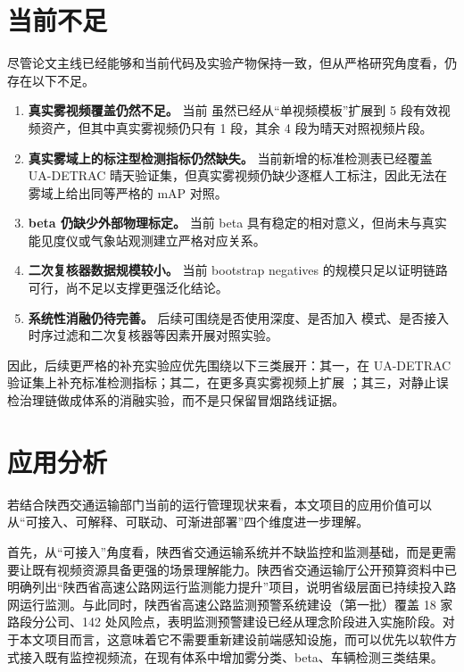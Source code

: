 \section{当前不足}

尽管论文主线已经能够和当前代码及实验产物保持一致，但从严格研究角度看，仍存在以下不足。

\begin{enumerate}[leftmargin=2.5em]
\item \textbf{真实雾视频覆盖仍然不足。} 当前  虽然已经从“单视频模板”扩展到 5 段有效视频资产，但其中真实雾视频仍只有 1 段，其余 4 段为晴天对照视频片段。
\item \textbf{真实雾域上的标注型检测指标仍然缺失。} 当前新增的标准检测表已经覆盖 UA-DETRAC 晴天验证集，但真实雾视频仍缺少逐框人工标注，因此无法在雾域上给出同等严格的 mAP 对照。
\item \textbf{beta 仍缺少外部物理标定。} 当前 beta 具有稳定的相对意义，但尚未与真实能见度仪或气象站观测建立严格对应关系。
\item \textbf{二次复核器数据规模较小。} 当前 bootstrap negatives 的规模只足以证明链路可行，尚不足以支撑更强泛化结论。
\item \textbf{系统性消融仍待完善。} 后续可围绕是否使用深度、是否加入  模式、是否接入时序过滤和二次复核器等因素开展对照实验。
\end{enumerate}

因此，后续更严格的补充实验应优先围绕以下三类展开：其一，在 UA-DETRAC 验证集上补充标准检测指标；其二，在更多真实雾视频上扩展 ；其三，对静止误检治理链做成体系的消融实验，而不是只保留冒烟路线证据。

\section{应用分析}

若结合陕西交通运输部门当前的运行管理现状来看，本文项目的应用价值可以从“可接入、可解释、可联动、可渐进部署”四个维度进一步理解。

首先，从“可接入”角度看，陕西省交通运输系统并不缺监控和监测基础，而是更需要让既有视频资源具备更强的场景理解能力。陕西省交通运输厅公开预算资料中已明确列出“陕西省高速公路网运行监测能力提升”项目，说明省级层面已持续投入路网运行监测。与此同时，陕西省高速公路监测预警系统建设（第一批）覆盖 18 家路段分公司、142 处风险点，表明监测预警建设已经从理念阶段进入实施阶段\cite{shaanxiBudget2025,shaanxiRiskProject2025}。对于本文项目而言，这意味着它不需要重新建设前端感知设施，而可以优先以软件方式接入既有监控视频流，在现有体系中增加雾分类、beta、车辆检测三类结果。

